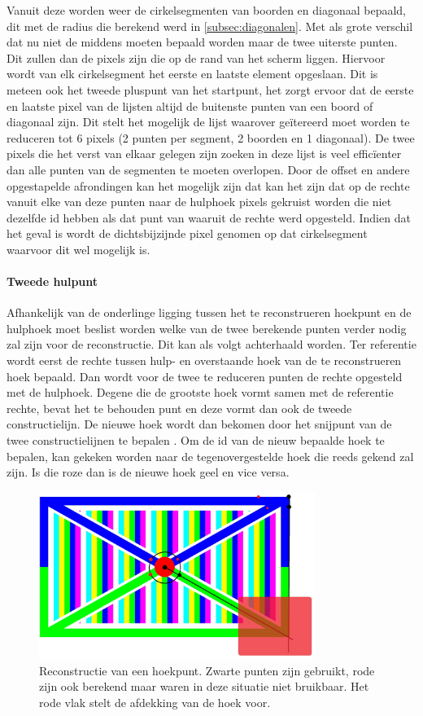 		Vanuit deze worden weer de cirkelsegmenten van boorden en diagonaal bepaald, dit met de radius die berekend werd in \ref{subsec:diagonalen}. Met als grote verschil dat nu niet de middens moeten bepaald worden maar de twee uiterste punten. Dit zullen dan de pixels zijn die op de rand van het scherm liggen. Hiervoor wordt van elk cirkelsegment het eerste en laatste element opgeslaan. Dit is meteen ook het tweede pluspunt van het startpunt, het zorgt ervoor dat de eerste en laatste pixel van de lijsten altijd de buitenste punten van een boord of diagonaal zijn. Dit stelt het mogelijk de lijst waarover geïtereerd moet worden te reduceren tot 6 pixels (2 punten per segment, 2 boorden en 1 diagonaal). De twee pixels die het verst van elkaar gelegen zijn zoeken in deze lijst is veel efficïenter dan alle punten van de segmenten te moeten overlopen. Door de offset en andere opgestapelde afrondingen kan het mogelijk zijn dat  kan het zijn dat op de rechte vanuit elke van deze punten naar de hulphoek pixels gekruist worden die niet dezelfde id hebben als dat punt van waaruit de rechte werd opgesteld. Indien dat het geval is wordt de dichtsbijzijnde pixel genomen op dat cirkelsegment waarvoor dit wel mogelijk is. \paragraph{Tweede hulpunt} Afhankelijk van de onderlinge ligging tussen het te reconstrueren hoekpunt en de hulphoek moet beslist worden welke van de twee berekende punten verder nodig zal zijn voor de reconstructie. Dit kan als volgt achterhaald worden. Ter referentie wordt eerst de rechte tussen hulp- en overstaande hoek van de te reconstrueren hoek bepaald. Dan wordt voor de twee te reduceren punten de rechte opgesteld met de hulphoek. Degene die de grootste hoek vormt samen met de referentie rechte, bevat het te behouden punt en deze vormt dan ook de tweede constructielijn. De nieuwe hoek wordt dan bekomen door het snijpunt van de twee constructielijnen te bepalen \cite{intersectie}. Om de id van de nieuw bepaalde hoek te bepalen, kan gekeken worden naar de tegenovergestelde hoek die reeds gekend zal zijn. Is die roze dan is de nieuwe hoek geel en vice versa. 
		
		\begin{figure}[H]
			\center
			\includegraphics[width=0.8\textwidth]{img/screenReconstruction.jpg}
			\caption{Reconstructie van een hoekpunt. Zwarte punten zijn gebruikt, rode zijn ook berekend maar waren in deze situatie niet bruikbaar. Het rode vlak stelt de afdekking van de hoek voor.}
			\label{html}
			\label{scherm}
		\end{figure}
		
	